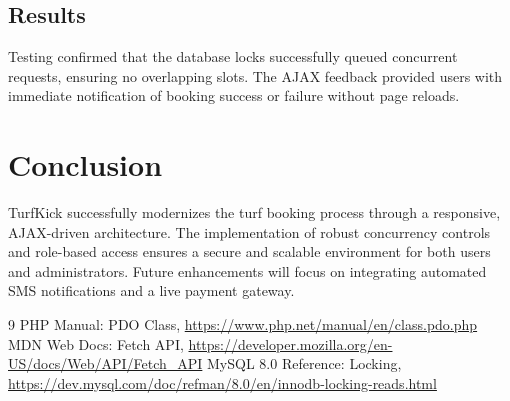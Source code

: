 \documentclass[12pt,a4paper]{report}
\begin{document}
\section{Results}
Testing confirmed that the database locks successfully queued concurrent requests, ensuring no overlapping slots. The AJAX feedback provided users with immediate notification of booking success or failure without page reloads.

\chapter{Conclusion}
TurfKick successfully modernizes the turf booking process through a responsive, AJAX-driven architecture. The implementation of robust concurrency controls and role-based access ensures a secure and scalable environment for both users and administrators. Future enhancements will focus on integrating automated SMS notifications and a live payment gateway.

\begin{thebibliography}{9}
 PHP Manual: PDO Class, \url{https://www.php.net/manual/en/class.pdo.php}
 MDN Web Docs: Fetch API, \url{https://developer.mozilla.org/en-US/docs/Web/API/Fetch_API}
 MySQL 8.0 Reference: Locking, \url{https://dev.mysql.com/doc/refman/8.0/en/innodb-locking-reads.html}
\end{thebibliography}
\end{document}
